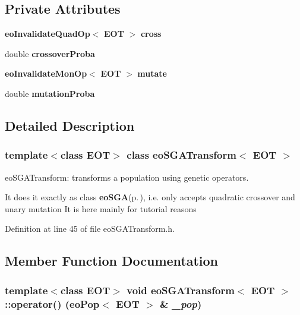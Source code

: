 \subsection*{Private Attributes}
\begin{CompactItemize}
\item 
{\bf eo\-Invalidate\-Quad\-Op}$<$ {\bf EOT} $>$ {\bf cross}\label{classeo_s_g_a_transform_r0}

\item 
double {\bf crossover\-Proba}\label{classeo_s_g_a_transform_r1}

\item 
{\bf eo\-Invalidate\-Mon\-Op}$<$ {\bf EOT} $>$ {\bf mutate}\label{classeo_s_g_a_transform_r2}

\item 
double {\bf mutation\-Proba}\label{classeo_s_g_a_transform_r3}

\end{CompactItemize}


\subsection{Detailed Description}
\subsubsection*{template$<$class EOT$>$ class eo\-SGATransform$<$ EOT $>$}

eo\-SGATransform: transforms a population using genetic operators. 

It does it exactly as class {\bf eo\-SGA}{\rm (p.\,\pageref{classeo_s_g_a})}, i.e. only accepts quadratic crossover and unary mutation It is here mainly for tutorial reasons 



Definition at line 45 of file eo\-SGATransform.h.

\subsection{Member Function Documentation}
\subsubsection{\setlength{\rightskip}{0pt plus 5cm}template$<$class EOT$>$ void {\bf eo\-SGATransform}$<$ {\bf EOT} $>$::operator() ({\bf eo\-Pop}$<$ {\bf EOT} $>$ \& {\em \_\-pop})\hspace{0.3cm}{\tt  [inline, virtual]}}\label{classeo_s_g_a_transform_a1}


